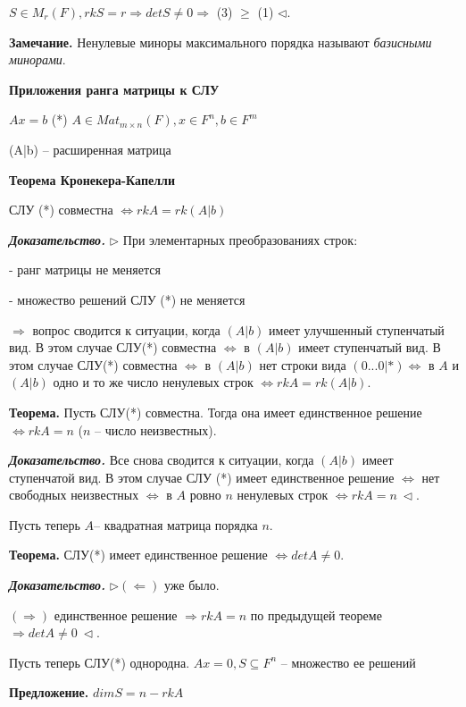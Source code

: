 $S \in M_r(F), rkS = r \Rightarrow detS \neq 0 \Rightarrow$ (3) $\geq$ (1) $\lhd$.

\bigskip
\textbf{Замечание.} Ненулевые миноры максимального порядка называют \textit{базисными минорами}.

\bigskip
\textbf{Приложения ранга матрицы к СЛУ}

$Ax=b$ (*) $A \in Mat_{m \times n} (F), x \in F^n, b \in F^m$

(A|b) -- расширенная матрица

\bigskip
\textbf{Теорема Кронекера-Капелли}

СЛУ (*) совместна $\Leftrightarrow rkA = rk(A|b)$

\bigskip
\textbf{\textit{Доказательство.}} $\rhd$ При элементарных преобразованиях строк:

- ранг матрицы не меняется

- множество решений СЛУ (*) не меняется

$\Rightarrow$ вопрос сводится к ситуации, когда $(A|b)$ имеет улучшенный ступенчатый вид. В этом случае СЛУ(*) совместна $\Leftrightarrow$ в $(A|b)$ имеет ступенчатый вид. В этом случае СЛУ(*) совместна $\Leftrightarrow$ в $(A|b)$ нет строки вида $(0...0|*) \Leftrightarrow$ в $A$ и $(A|b)$ одно и то же число ненулевых строк $\Leftrightarrow rkA = rk(A|b)$.

\bigskip
\textbf{Теорема.} Пусть СЛУ(*) совместна. Тогда она имеет единственное решение $\Leftrightarrow rkA = n$ ($n$ -- число неизвестных). 

\bigskip
\textbf{\textit{Доказательство.}} Все снова сводится к ситуации, когда $(A|b)$ имеет ступенчатой вид. В этом случае СЛУ (*) имеет единственное решение $\Leftrightarrow$ нет свободных неизвестных $\Leftrightarrow$ в $A$ ровно $n$ ненулевых строк $\Leftrightarrow rkA = n \ \lhd$.

\bigskip
Пусть теперь $A$-- квадратная матрица порядка $n$.

\bigskip
\textbf{Теорема.} СЛУ(*) имеет единственное решение $\Leftrightarrow detA \neq 0$.

\bigskip
\textbf{\textit{Доказательство.}} $\rhd (\Leftarrow)$ уже было.

$(\Rightarrow)$ единственное решение $\Rightarrow rkA = n$ по предыдущей теореме $\Rightarrow detA \neq 0 \ \lhd$.


\bigskip
Пусть теперь СЛУ(*) однородна. $Ax = 0, S \subseteq F^n$ -- множество ее решений

\bigskip
\textbf{Предложение.} $dimS = n - rkA$

